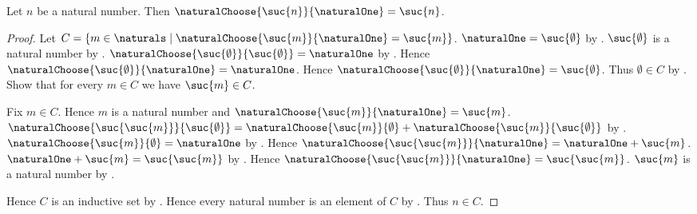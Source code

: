 \begin{proposition}\label{natural_choose_one}
    Let $n$ be a natural number.
    Then $\naturalChoose{\suc{n}}{\naturalOne}=\suc{n}$.
\end{proposition}
\begin{proof}
    Let $C=\{m\in\naturals\mid
        \naturalChoose{\suc{m}}{\naturalOne}=\suc{m}\}$.
    $\naturalOne=\suc{\emptyset}$ by .
    $\suc{\emptyset}$ is a natural number by
        .
    $\naturalChoose{\suc{\emptyset}}{\suc{\emptyset}}
        =\naturalOne$ by .
    Hence $\naturalChoose{\suc{\emptyset}}{\naturalOne}
        =\naturalOne$.
    Hence $\naturalChoose{\suc{\emptyset}}{\naturalOne}
        =\suc{\emptyset}$.
    Thus $\emptyset\in C$ by .
    Show that for every $m\in C$ we have $\suc{m}\in C$.
    \begin{subproof}
        Fix $m\in C$.
        Hence $m$ is a natural number and
            $\naturalChoose{\suc{m}}{\naturalOne}=\suc{m}$.
        $\naturalChoose{\suc{\suc{m}}}{\suc{\emptyset}}
            =\naturalChoose{\suc{m}}{\emptyset}
                +\naturalChoose{\suc{m}}{\suc{\emptyset}}$ by
            .
        $\naturalChoose{\suc{m}}{\emptyset}=\naturalOne$ by
            .
        Hence $\naturalChoose{\suc{\suc{m}}}{\naturalOne}
            =\naturalOne+\suc{m}$.
        $\naturalOne+\suc{m}=\suc{\suc{m}}$ by
            .
        Hence $\naturalChoose{\suc{\suc{m}}}{\naturalOne}
            =\suc{\suc{m}}$.
        $\suc{m}$ is a natural number by .
    \end{subproof}
    Hence $C$ is an inductive set by .
    Hence every natural number is an element of $C$ by
        .
    Thus $n\in C$.
\end{proof}

